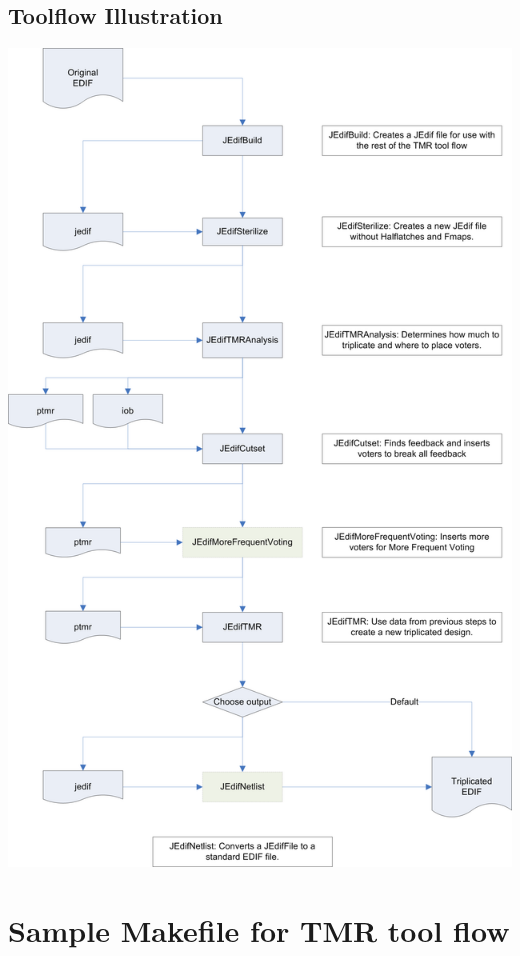 \documentclass[english]{article}
\begin{document}
\subsection{Toolflow Illustration}
\includegraphics[scale=0.8]{tool_flow.png}
\newpage

\newpage

\newpage

\newpage

\newpage

\newpage

\newpage

\newpage

\newpage

\newpage

\newpage


\newpage
\section{Sample Makefile for TMR tool flow}
\end{document}
